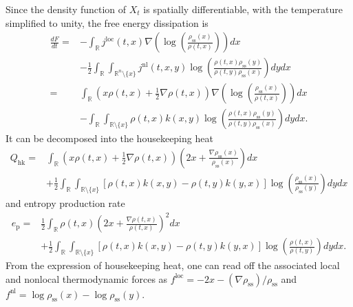 \documentclass[10pt]{article}
\theoremstyle{definition}
\numberwithin{equation}{section}
\begin{document}
Since the density function of $X_t$ is spatially differentiable, with the temperature simplified to unity, the free energy dissipation is
\begin{align*}
    \frac{dF}{dt}
    =& -\int_{\mathbb{R}} j^\mathrm{loc}(t,x)\nabla\left( \log\left(\frac{\rho_\mathrm{ss}(x)}{\rho(t,x)}\right) \right) dx \\
    &- \frac{1}{2}\int_{\mathbb{R}}\int_{\mathbb{R}^n \setminus \{x\}} j^\mathrm{nl}(t,x,y)\log \left( \frac{\rho(t,x) \rho_\mathrm{ss}(y)}{\rho(t,y)\rho_\mathrm{ss}(x)} \right) dydx\\
    =& \int_{\mathbb{R}} \left( x\rho(t,x) + \frac{1}{2}\nabla\rho(t,x) \right) \nabla\left( \log\left(\frac{\rho_\mathrm{ss}(x)}{\rho(t,x)}\right) \right)dx\\
    &- \int_{\mathbb{R}}\int_{\mathbb{R} \setminus \{x\}} \rho(t,x)k(x,y)\log \left( \frac{\rho(t,x) \rho_\mathrm{ss}(y)}{\rho(t,y)\rho_\mathrm{ss}(x)} \right) dydx.
\end{align*}
It can be decomposed into the housekeeping heat
\begin{align*}
    Q_\mathrm{hk}
    =& \int_{\mathbb{R}}\left( x\rho(t,x) + \frac{1}{2}\nabla\rho(t,x) \right)\left( 2x + \frac{\nabla\rho_\mathrm{ss}(x)}{\rho_\mathrm{ss}(x)}\right)dx\\
    &+ \frac{1}{2}\int_{\mathbb{R}}\int_{\mathbb{R} \setminus \{x\}} [\rho(t,x)k(x,y) - \rho(t,y)k(y,x)]\log \left( \frac{\rho_\mathrm{ss}(x)}{\rho_\mathrm{ss}(y)} \right) dydx
\end{align*}
and entropy production rate
\begin{align*}
    e_\mathrm{p} 
    =& \frac{1}{2}\int_\mathbb{R}\rho(t,x)\left( 2x + \frac{\nabla\rho(t,x)}{\rho(t,x)} \right)^2 dx\\
    &+ \frac{1}{2}\int_{\mathbb{R}}\int_{\mathbb{R} \setminus \{x\}} [\rho(t,x)k(x,y) - \rho(t,y)k(y,x)]\log \left( \frac{\rho(t,x)}{\rho(t,y)} \right) dydx.
\end{align*}
From the expression of housekeeping heat, one can read off the associated local and nonlocal thermodynamic forces as $f^\mathrm{loc} = -2x-(\nabla\rho_\mathrm{ss})/\rho_\mathrm{ss}$ and $f^\mathrm{nl}=\log\rho_\mathrm{ss}(x)-\log\rho_\mathrm{ss}(y)$.
\end{document}
